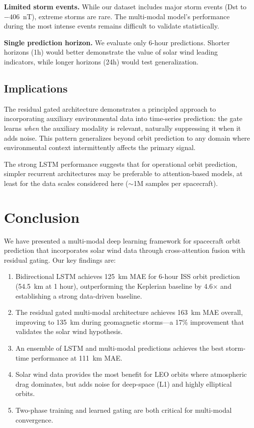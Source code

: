 \documentclass[twocolumn]{article}
\begin{document}
\textbf{Limited storm events.} While our dataset includes major storm
events (Dst to $-406$~nT), extreme storms are rare. The multi-modal model's
performance during the most intense events remains difficult to validate
statistically.

\textbf{Single prediction horizon.} We evaluate only 6-hour predictions.
Shorter horizons (1h) would better demonstrate the value of solar wind
leading indicators, while longer horizons (24h) would test generalization.

\subsection{Implications}

The residual gated architecture demonstrates a principled approach to
incorporating auxiliary environmental data into time-series prediction:
the gate learns \emph{when} the auxiliary modality is relevant, naturally
suppressing it when it adds noise. This pattern generalizes beyond orbit
prediction to any domain where environmental context intermittently
affects the primary signal.

The strong LSTM performance suggests that for operational orbit prediction,
simpler recurrent architectures may be preferable to attention-based models,
at least for the data scales considered here ($\sim$1M samples per spacecraft).

\section{Conclusion}
\label{sec:conclusion}

We have presented a multi-modal deep learning framework for spacecraft
orbit prediction that incorporates solar wind data through cross-attention
fusion with residual gating. Our key findings are:

\begin{enumerate}
  \item Bidirectional LSTM achieves 125~km MAE for 6-hour ISS orbit
    prediction (54.5~km at 1 hour), outperforming the Keplerian baseline
    by 4.6$\times$ and establishing a strong data-driven baseline.
  \item The residual gated multi-modal architecture achieves 163~km MAE
    overall, improving to 135~km during geomagnetic storms---a 17\%
    improvement that validates the solar wind hypothesis.
  \item An ensemble of LSTM and multi-modal predictions achieves the
    best storm-time performance at 111~km MAE.
  \item Solar wind data provides the most benefit for LEO orbits where
    atmospheric drag dominates, but adds noise for deep-space (L1) and
    highly elliptical orbits.
  \item Two-phase training and learned gating are both critical for
    multi-modal convergence.
\end{enumerate}
\end{document}
